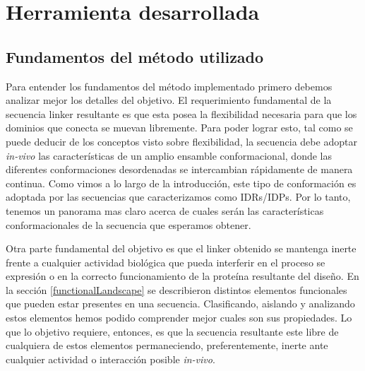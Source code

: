 
\chapter{Herramienta desarrollada}
\label{method}


\section{Fundamentos del método utilizado}
\label{fundamentos}

Para entender los fundamentos del método implementado primero debemos analizar mejor los detalles del objetivo.
El requerimiento fundamental de la secuencia linker resultante es que esta posea la flexibilidad necesaria para que los dominios que conecta se muevan libremente.
Para poder lograr esto, tal como se puede deducir de los conceptos visto sobre flexibilidad, la secuencia
debe adoptar \textit{in-vivo} las características de un amplio ensamble conformacional, donde las diferentes conformaciones desordenadas se intercambian rápidamente de manera continua.
Como vimos a lo largo de la introducción, este tipo de conformación es adoptada por las secuencias que caracterizamos como IDRs/IDPs.
Por lo tanto, tenemos un panorama mas claro acerca de cuales serán las características conformacionales de la secuencia que esperamos obtener.


Otra parte fundamental del objetivo es que el linker obtenido se mantenga inerte frente a cualquier actividad biológica que pueda 
interferir en el proceso se expresión o en la correcto funcionamiento de la proteína resultante del diseño.
En la sección \ref{functionalLandscape} se describieron distintos elementos funcionales que pueden estar presentes en una secuencia.
Clasificando, aislando y analizando estos elementos hemos podido comprender mejor cuales son sus propiedades. 
Lo que lo objetivo requiere, entonces, es que la secuencia resultante este libre de cualquiera de estos elementos permaneciendo, preferentemente, inerte ante cualquier actividad o interacción posible \textit{in-vivo}.

